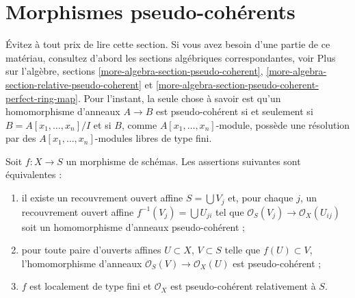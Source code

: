 \section{Morphismes pseudo-cohérents}
\label{section-pseudo-coherent}

\noindent
Évitez à tout prix de lire cette section.
Si vous avez besoin d'une partie de ce matériau, consultez d'abord les
sections algébriques correspondantes, voir
Plus sur l'algèbre, sections \ref{more-algebra-section-pseudo-coherent},
\ref{more-algebra-section-relative-pseudo-coherent} et
\ref{more-algebra-section-pseudo-coherent-perfect-ring-map}.
Pour l'instant, la seule chose à savoir est qu'un homomorphisme d'anneaux
$A \to B$ est pseudo-cohérent si et seulement si $B = A[x_1, \ldots, x_n]/I$
et si $B$, comme $A[x_1, \ldots, x_n]$-module, possède une résolution par des
$A[x_1, \ldots, x_n]$-modules libres de type fini.

\begin{lemma}
\label{lemma-pseudo-coherent}
Soit $f : X \to S$ un morphisme de schémas. Les assertions suivantes sont équivalentes :
\begin{enumerate}
\item il existe un recouvrement ouvert affine $S = \bigcup V_j$ et, pour chaque $j$,
un recouvrement ouvert affine $f^{-1}(V_j) = \bigcup U_{ji}$ tel que
$\mathcal{O}_S(V_j) \to \mathcal{O}_X(U_{ij})$ soit un homomorphisme
d'anneaux pseudo-cohérent ;
\item pour toute paire d'ouverts affines $U \subset X$, $V \subset S$
telle que $f(U) \subset V$, l'homomorphisme d'anneaux
$\mathcal{O}_S(V) \to \mathcal{O}_X(U)$ est pseudo-cohérent ;
\item $f$ est localement de type fini et $\mathcal{O}_X$
est pseudo-cohérent relativement à $S$.
\end{enumerate}
\end{lemma}

